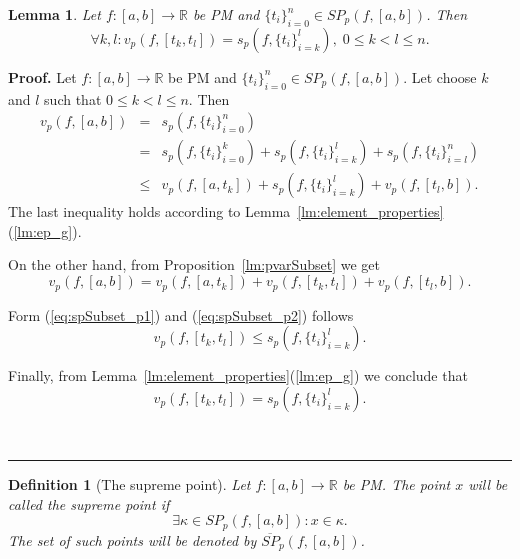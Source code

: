 \documentclass[12pt, a4paper]{article}
\newtheorem{lemma}[theorem]{Lemma}
\newtheorem{definition}[theorem]{Definition}
\newenvironment{proof}[1][Proof]{\noindent \textbf{#1.} }{\  \rule{0.5em}{0.5em}}
\numberwithin{equation}{section}
\begin{document}
\begin{lemma}\label{lm:spSubset}
  Let $f:[a,b] \rightarrow \mathbb{R}$ be PM 
  and $\{t_i\}_{i=0}^{n} \in SP_{p}(f,[a,b])$. Then
  \begin{equation}
    \forall k,l: v_p(f,[t_k, t_l]) = 
      s_p\left(f,\{t_i\}_{i=k}^{l}\right) ,\; 0 \leq k<l\leq n. 
  \end{equation}
\end{lemma}
\begin{proof}
  Let $f:[a,b] \rightarrow \mathbb{R}$ be PM 
  and $\{t_i\}_{i=0}^{n} \in SP_{p}(f,[a,b])$. 
  Let choose $k$ and $l$ such that $0\leq k<l\leq n$.
  Then 
  \begin{eqnarray}
    v_p(f, [a, b]) & = & s_p(f,\{t_i\}_{i=0}^{n}) \\
    & = & s_p(f,\{t_i\}_{i=0}^{k})+s_p(f,\{t_i\}_{i=k}^{l})
      +s_p(f,\{t_i\}_{i=l}^{n})\\
    \label{eq:spSubset_p1}  
    & \leq & v_p(f, [a,t_k]) + s_p(f,\{t_i\}_{i=k}^{l})
      +v_p(f, [t_l, b]).         
  \end{eqnarray}    
  The last inequality holds according to 
  Lemma~\ref{lm:element_properties}(\ref{lm:ep_g}).  
    
  On the other hand, from Proposition~\ref{lm:pvarSubset}
  we get
  \begin{equation}\label{eq:spSubset_p2}  
    v_p(f, [a, b]) = 
      v_p(f, [a,t_k]) + v_p(f,[t_k, t_l])
      +v_p(f, [t_l, b]).     
  \end{equation}      
  
  Form (\ref{eq:spSubset_p1}) and (\ref{eq:spSubset_p2})
  follows 
  \begin{equation} 
    v_p(f,[t_k, t_l]) \leq s_p(f,\{t_i\}_{i=k}^{l}).  
  \end{equation} 
  
  Finally, from Lemma~\ref{lm:element_properties}(\ref{lm:ep_g})
  we conclude that 
  \begin{equation} 
    v_p(f,[t_k, t_l]) = s_p(f,\{t_i\}_{i=k}^{l}).  
  \end{equation}   
  
\end{proof}


\begin{definition}[The supreme point]\label{def:psp}
  Let $f:[a,b] \rightarrow \mathbb{R}$ be PM.  
  The point $x$ will be called the \emph{supreme point}
  if 
  \begin{equation}
    \exists \kappa \in SP_p(f, [a,b]): x \in \kappa.
  \end{equation} 
  The set of such points will be denoted by 
  $\overline{SP}_p(f, [a, b])$.
\end{definition}
\end{document}
